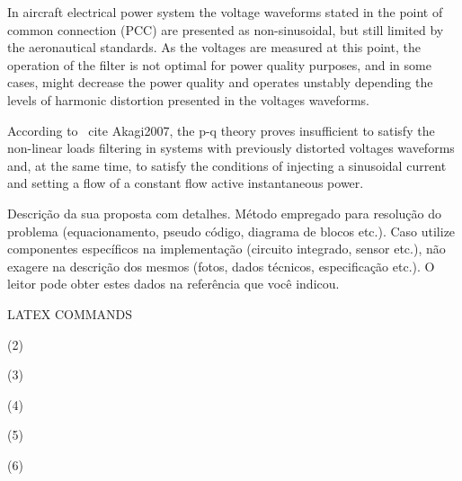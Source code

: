 In aircraft electrical power system the voltage waveforms stated in the point of common connection (PCC) are presented as non-sinusoidal, but still limited by the aeronautical standards. As the voltages are measured at this point, the operation of the filter is not optimal for power quality purposes, and in some cases, might decrease the power quality and operates unstably depending the levels of harmonic distortion presented in the voltages waveforms.

According to \ cite {Akagi2007}, the p-q theory proves insufficient to satisfy the non-linear loads filtering in systems with previously distorted voltages waveforms and, at the same time, to satisfy the conditions of injecting a sinusoidal current and setting a flow of a constant flow active instantaneous power.  
 

Descrição da sua proposta com detalhes. Método empregado para resolução do problema (equacionamento, pseudo código, diagrama de blocos etc.).
Caso utilize componentes específicos na implementação (circuito integrado, sensor etc.), não exagere na descrição dos mesmos (fotos, dados técnicos, especificação etc.). O leitor pode obter estes dados na referência que você indicou.

LATEX COMMANDS



(2)	

(3)	

(4)	

(5)	

(6)	

